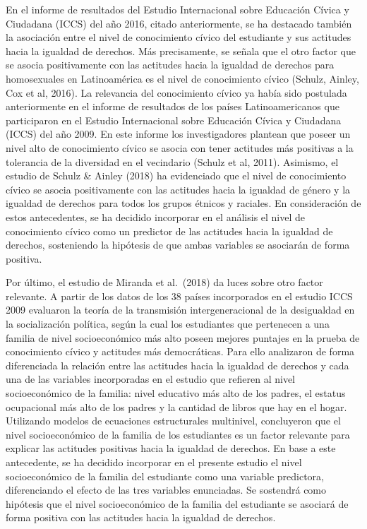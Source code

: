 \documentclass[12pt,twoside]{templates/facsothesis}
\begin{document}
En el informe de resultados del Estudio Internacional sobre Educación Cívica y Ciudadana (ICCS) del año 2016, citado anteriormente, se ha destacado también la asociación entre el nivel de conocimiento cívico del estudiante y sus actitudes hacia la igualdad de derechos. Más precisamente, se señala que el otro factor que se asocia positivamente con las actitudes hacia la igualdad de derechos para homosexuales en Latinoamérica es el nivel de conocimiento cívico (Schulz, Ainley, Cox et al, 2016). La relevancia del conocimiento cívico ya había sido postulada anteriormente en el informe de resultados de los países Latinoamericanos que participaron en el Estudio Internacional sobre Educación Cívica y Ciudadana (ICCS) del año 2009. En este informe los investigadores plantean que poseer un nivel alto de conocimiento cívico se asocia con tener actitudes más positivas a la tolerancia de la diversidad en el vecindario (Schulz et al, 2011). Asimismo, el estudio de Schulz \& Ainley (2018) ha evidenciado que el nivel de conocimiento cívico se asocia positivamente con las actitudes hacia la igualdad de género y la igualdad de derechos para todos los grupos étnicos y raciales. En consideración de estos antecedentes, se ha decidido incorporar en el análisis el nivel de conocimiento cívico como un predictor de las actitudes hacia la igualdad de derechos, sosteniendo la hipótesis de que ambas variables se asociarán de forma positiva.

Por último, el estudio de Miranda et al.~(2018) da luces sobre otro factor relevante. A partir de los datos de los 38 países incorporados en el estudio ICCS 2009 evaluaron la teoría de la transmisión intergeneracional de la desigualdad en la socialización política, según la cual los estudiantes que pertenecen a una familia de nivel socioeconómico más alto poseen mejores puntajes en la prueba de conocimiento cívico y actitudes más democráticas. Para ello analizaron de forma diferenciada la relación entre las actitudes hacia la igualdad de derechos y cada una de las variables incorporadas en el estudio que refieren al nivel socioeconómico de la familia: nivel educativo más alto de los padres, el estatus ocupacional más alto de los padres y la cantidad de libros que hay en el hogar. Utilizando modelos de ecuaciones estructurales multinivel, concluyeron que el nivel socioeconómico de la familia de los estudiantes es un factor relevante para explicar las actitudes positivas hacia la igualdad de derechos. En base a este antecedente, se ha decidido incorporar en el presente estudio el nivel socioeconómico de la familia del estudiante como una variable predictora, diferenciando el efecto de las tres variables enunciadas. Se sostendrá como hipótesis que el nivel socioeconómico de la familia del estudiante se asociará de forma positiva con las actitudes hacia la igualdad de derechos.
\end{document}
